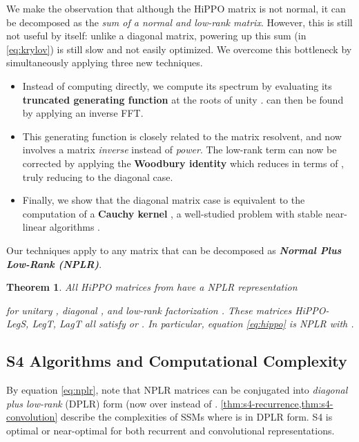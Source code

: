 \documentclass{article}
\newtheorem{theorem}{Theorem}
\newcommand{\methodabbrv}{S4}
\begin{document}
We make the observation that although the HiPPO matrix is not normal, it can be decomposed as the \emph{sum of a normal and low-rank matrix}.
However, this is still not useful by itself:
unlike a diagonal matrix, powering up this sum (in \eqref{eq:krylov}) is still slow and not easily optimized.
We overcome this bottleneck by simultaneously applying three new techniques.
\begin{itemize}[leftmargin=*]\item Instead of computing  directly,
    we compute its spectrum by evaluating its \textbf{truncated generating function}  at the roots of unity .
     can then be found by applying an inverse FFT.
  \item This generating function is closely related to the matrix resolvent, and now involves a matrix \emph{inverse} instead of \emph{power}.
    The low-rank term can now be corrected by applying the \textbf{Woodbury identity} which reduces  in terms of , truly reducing to the diagonal case.
  \item Finally, we show that the diagonal matrix case is equivalent to the computation of a \textbf{Cauchy kernel} , a well-studied problem with stable near-linear algorithms \citep{pan2015transformations,pan2017fast}.
\end{itemize}


Our techniques apply to any matrix that can be decomposed as \emph{\textbf{Normal Plus Low-Rank (NPLR)}}.
\begin{theorem}\label{thm:hippo-nplr}
  All HiPPO matrices from \citep{gu2020hippo} have a NPLR representation
  
  for unitary , diagonal , and low-rank factorization .
  These matrices HiPPO- LegS, LegT, LagT all satisfy  or .
  In particular, equation \eqref{eq:hippo} is NPLR with .
\end{theorem}

\subsection{\methodabbrv{} Algorithms and Computational Complexity}
\label{sec:s4-efficiency}

By equation \eqref{eq:nplr}, note that NPLR matrices can be conjugated into \emph{diagonal plus low-rank} (DPLR) form
(now over  instead of .
\cref{thm:s4-recurrence,thm:s4-convolution} describe the complexities of SSMs where  is in DPLR form.
\methodabbrv{} is optimal or near-optimal for both recurrent and convolutional representations.
\end{document}
